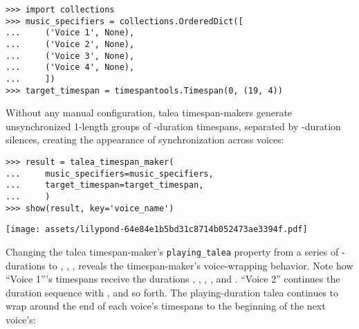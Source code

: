 \begin{abjadbookoutput}
\begin{singlespacing}
\vspace{-0.5\baselineskip}
\begin{verbatim}
>>> import collections
>>> music_specifiers = collections.OrderedDict([
...     ('Voice 1', None),
...     ('Voice 2', None),
...     ('Voice 3', None),
...     ('Voice 4', None),
...     ])
>>> target_timespan = timespantools.Timespan(0, (19, 4))
\end{verbatim}
\end{singlespacing}
\end{abjadbookoutput}

\noindent Without any manual configuration, talea timespan-makers generate
unsynchronized 1-length groups of -duration timespans, separated by
-duration silences, creating the appearance of synchronization
across voices:

\begin{comment}
<abjad>
result = talea_timespan_maker(
    music_specifiers=music_specifiers,
    target_timespan=target_timespan,
    )
show(result, key='voice_name')
</abjad>
\end{comment}

\begin{abjadbookoutput}
\begin{singlespacing}
\vspace{-0.5\baselineskip}
\begin{verbatim}
>>> result = talea_timespan_maker(
...     music_specifiers=music_specifiers,
...     target_timespan=target_timespan,
...     )
>>> show(result, key='voice_name')
\end{verbatim}
\noindent\texttt{[image: assets/lilypond-64e84e1b5bd31c8714b052473ae3394f.pdf]}
\end{singlespacing}
\end{abjadbookoutput}

\noindent Changing the talea timespan-maker's \texttt{playing\_talea} property
from a series of -durations to , ,
,  reveals the timespan-maker's voice-wrapping
behavior. Note how \enquote{Voice 1}'s timespans receive the durations
, , , ,  and
. \enquote{Voice 2} continues the duration sequence with
,  and so forth. The playing-duration talea continues
to wrap around the end of each voice's timespans to the beginning of the next
voice's:

